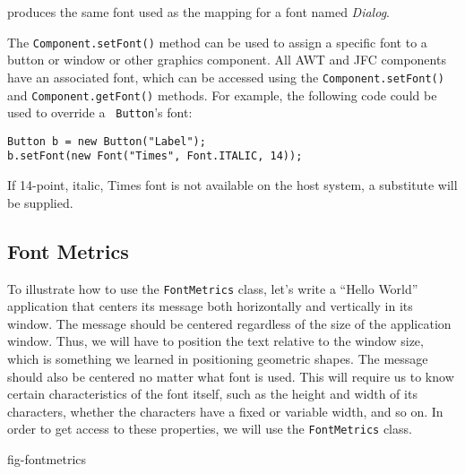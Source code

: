 \noindent produces the same font used as the mapping for a
font named {\em Dialog}.


The {\tt Component.setFont()} method can be used to assign a specific
font to a button or window or other graphics component.  All AWT and
JFC components have an associated font, which can be accessed using
the {\tt Component.setFont()} and {\tt Component.getFont()} methods.
For example, the following code could be used to override a {\tt
Button}'s font:

\begin{jjjlisting}
\begin{lstlisting}
Button b = new Button("Label");
b.setFont(new Font("Times", Font.ITALIC, 14));
\end{lstlisting}
\end{jjjlisting}

\noindent If 14-point, italic, Times font is not available on the
host system, a substitute will be supplied.

\subsection{Font Metrics}
\noindent To illustrate how to use the {\tt FontMetrics} class, let's write a
``Hello World'' application that centers its message both horizontally and
vertically in its window.  The message should be centered
regardless of the size of the application window.  Thus, we will have to
position the text relative to the window size, which is something we
learned in positioning geometric shapes.   The message
should also be centered no matter what font is used.  This will require
us to know certain characteristics of the font itself, such as the
height and width of its characters, whether the characters have a
fixed or variable width, and so on.  In order to get access to
these properties, we will use the {\tt FontMetrics} class.

{fig-fontmetrics}

